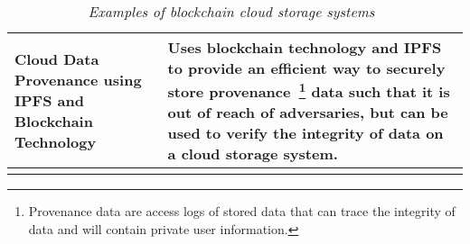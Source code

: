 \begin{longtable}{ p{} p{} }
  \x
  Cloud Data Provenance using IPFS and Blockchain Technology~\cite{hasan_cloud_2019}
  & Uses blockchain technology and IPFS to provide an efficient way to securely store provenance~\footnote{Provenance data are access logs of stored data that can trace the integrity of data and will contain private user information.} data such that it is out of reach of adversaries, but can be used to verify the integrity of data on a cloud storage system. 
  \\\bottomrule\bottomrule
  \caption{\textit{Examples of blockchain cloud storage systems~\cite{sharma_blockchain_2021} }}
  \label{tab:blockhain cloud storage}
\end{longtable}

